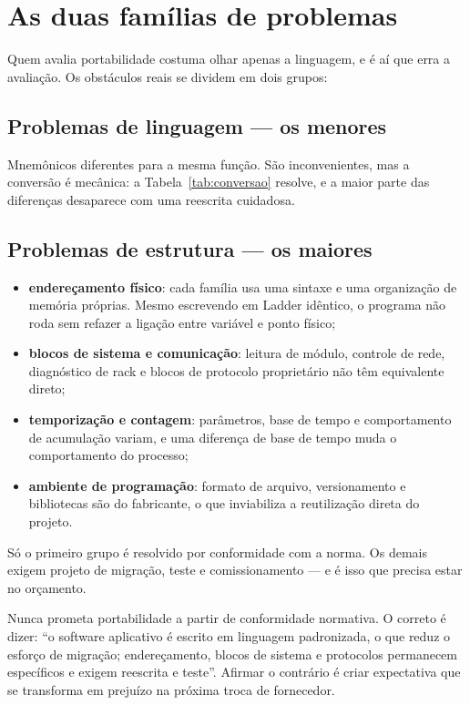 \section{As duas famílias de problemas}

Quem avalia portabilidade costuma olhar apenas a linguagem, e é aí que erra a avaliação. Os
obstáculos reais se dividem em dois grupos:

\subsection{Problemas de linguagem --- os menores}

Mnemônicos diferentes para a mesma função. São inconvenientes, mas a conversão é mecânica: a
Tabela~\ref{tab:conversao} resolve, e a maior parte das diferenças desaparece com uma reescrita
cuidadosa.

\subsection{Problemas de estrutura --- os maiores}

\begin{itemize}
  \item \textbf{endereçamento físico}: cada família usa uma sintaxe e uma organização de memória
        próprias. Mesmo escrevendo em Ladder idêntico, o programa não roda sem refazer a ligação
        entre variável e ponto físico;
  \item \textbf{blocos de sistema e comunicação}: leitura de módulo, controle de rede, diagnóstico de
        rack e blocos de protocolo proprietário não têm equivalente direto;
  \item \textbf{temporização e contagem}: parâmetros, base de tempo e comportamento de acumulação
        variam, e uma diferença de base de tempo muda o comportamento do processo;
  \item \textbf{ambiente de programação}: formato de arquivo, versionamento e bibliotecas são do
        fabricante, o que inviabiliza a reutilização direta do projeto.
\end{itemize}

Só o primeiro grupo é resolvido por conformidade com a norma. Os demais exigem projeto de migração,
teste e comissionamento --- e é isso que precisa estar no orçamento.

\begin{atencao}
Nunca prometa portabilidade a partir de conformidade normativa. O correto é dizer: ``o software
aplicativo é escrito em linguagem padronizada, o que reduz o esforço de migração; endereçamento,
blocos de sistema e protocolos permanecem específicos e exigem reescrita e teste''. Afirmar o
contrário é criar expectativa que se transforma em prejuízo na próxima troca de fornecedor.
\end{atencao}

